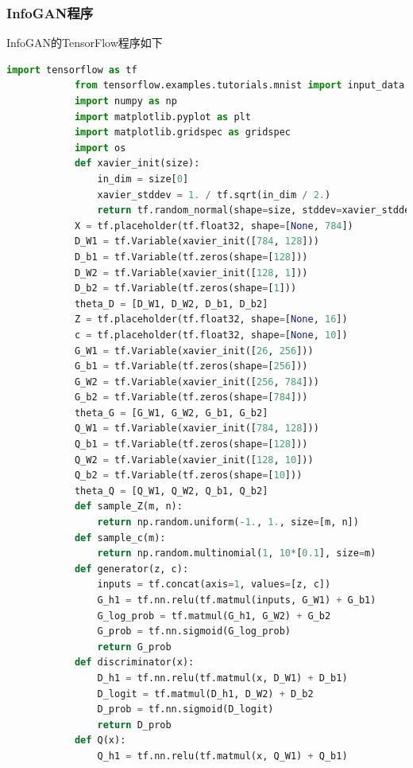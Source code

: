         \subsubsection{InfoGAN程序}
            \par
            InfoGAN的TensorFlow程序如下
            \begin{lstlisting}[language = Python]
            import tensorflow as tf
            from tensorflow.examples.tutorials.mnist import input_data
            import numpy as np
            import matplotlib.pyplot as plt
            import matplotlib.gridspec as gridspec
            import os
            def xavier_init(size):
                in_dim = size[0]
                xavier_stddev = 1. / tf.sqrt(in_dim / 2.)
                return tf.random_normal(shape=size, stddev=xavier_stddev)
            X = tf.placeholder(tf.float32, shape=[None, 784])
            D_W1 = tf.Variable(xavier_init([784, 128]))
            D_b1 = tf.Variable(tf.zeros(shape=[128]))
            D_W2 = tf.Variable(xavier_init([128, 1]))
            D_b2 = tf.Variable(tf.zeros(shape=[1]))
            theta_D = [D_W1, D_W2, D_b1, D_b2]
            Z = tf.placeholder(tf.float32, shape=[None, 16])
            c = tf.placeholder(tf.float32, shape=[None, 10])
            G_W1 = tf.Variable(xavier_init([26, 256]))
            G_b1 = tf.Variable(tf.zeros(shape=[256]))
            G_W2 = tf.Variable(xavier_init([256, 784]))
            G_b2 = tf.Variable(tf.zeros(shape=[784]))
            theta_G = [G_W1, G_W2, G_b1, G_b2]
            Q_W1 = tf.Variable(xavier_init([784, 128]))
            Q_b1 = tf.Variable(tf.zeros(shape=[128]))
            Q_W2 = tf.Variable(xavier_init([128, 10]))
            Q_b2 = tf.Variable(tf.zeros(shape=[10]))
            theta_Q = [Q_W1, Q_W2, Q_b1, Q_b2]
            def sample_Z(m, n):
                return np.random.uniform(-1., 1., size=[m, n])
            def sample_c(m):
                return np.random.multinomial(1, 10*[0.1], size=m)
            def generator(z, c):
                inputs = tf.concat(axis=1, values=[z, c])
                G_h1 = tf.nn.relu(tf.matmul(inputs, G_W1) + G_b1)
                G_log_prob = tf.matmul(G_h1, G_W2) + G_b2
                G_prob = tf.nn.sigmoid(G_log_prob)
                return G_prob
            def discriminator(x):
                D_h1 = tf.nn.relu(tf.matmul(x, D_W1) + D_b1)
                D_logit = tf.matmul(D_h1, D_W2) + D_b2
                D_prob = tf.nn.sigmoid(D_logit)
                return D_prob
            def Q(x):
                Q_h1 = tf.nn.relu(tf.matmul(x, Q_W1) + Q_b1)

\end{lstlisting}
